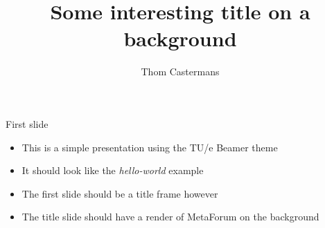 \documentclass[12pt, aspectratio=169]{beamer} %
\title{Some interesting title on a background}
\author{Thom Castermans}
\begin{document}
\begin{titleframe}
\end{titleframe}

\begin{frame}{First slide}
  \begin{itemize}
    \item This is a simple presentation using the TU/e Beamer theme
    \item It should look like the \textit{hello-world} example
    \item The first slide should be a title frame however
    \item The title slide should have a render of MetaForum on the background
  \end{itemize}
\end{frame}
\end{document}
